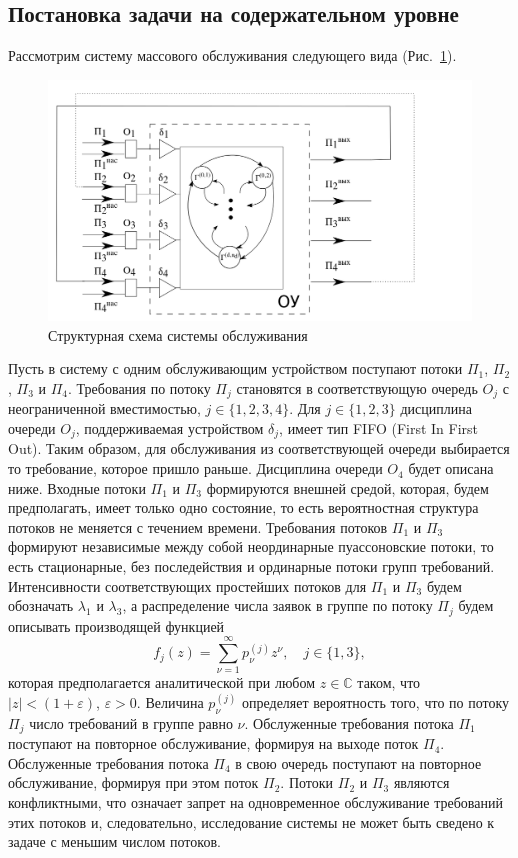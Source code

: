 \documentclass[a4paper,12pt,russian]{extarticle}
\begin{document}
\subsection{Постановка задачи на содержательном уровне}
Рассмотрим систему массового обслуживания следующего вида (Рис.~\ref{SystemScheme}).
\begin{figure}[h]
\includegraphics[scale=0.45]{SystemScheme.png} 
\caption{Структурная схема системы обслуживания}
\label{SystemScheme}
\end{figure}
Пусть в систему с одним обслуживающим устройством поступают потоки $\Pi_1$, $\Pi_2$, $\Pi_3$  и $\Pi_4$. Требования по потоку $\Pi_j$ становятся в соответствующую очередь $O_j$ с неограниченной вместимостью, $j\in \{1, 2, 3, 4\}$. Для $j \in \{1, 2, 3\}$ дисциплина очереди $O_j$, поддерживаемая устройством $\delta_j$, имеет тип FIFO (First In First Out). Таким образом, для обслуживания из соответствующей очереди выбирается то требование, которое пришло раньше. Дисциплина очереди $O_4$ будет описана ниже. Входные потоки $\Pi_1$ и $\Pi_3$ формируются внешней средой, которая, будем предполагать, имеет только одно состояние, то есть вероятностная структура потоков не меняется с течением времени. Требования потоков $\Pi_1$ и $\Pi_3$ формируют независимые между собой неординарные пуассоновские потоки, то есть  стационарные, без последействия и ординарные потоки групп требований. Интенсивности соответствующих простейших потоков для $\Pi_1$ и $\Pi_3$ будем обозначать $\lambda_1$ и $\lambda_3$, а распределение числа заявок в группе по потоку $\Pi_j$ будем описывать производящей функцией
\begin{equation}
f_j(z) = \sum_{\nu=1}^{\infty} p_{\nu}^{(j)} z ^{\nu}, \quad j\in \{1,3\},
\label{GeneratingFunc}
\end{equation}
которая предполагается аналитической при любом $z\in \mathbb{C}$ таком, что $|z|<(1+\varepsilon)$, $\varepsilon>0$. Величина $p_{\nu}^{(j)}$ определяет вероятность того, что по потоку $\Pi_j$ число требований в группе равно $\nu$. Обслуженные требования потока $\Pi_1$ поступают на повторное обслуживание, формируя на выходе поток $\Pi_4$. Обслуженные требования потока $\Pi_4$ в свою очередь поступают на повторное обслуживание, формируя при этом поток $\Pi_2$. Потоки $\Pi_2$ и $\Pi_3$ являются конфликтными, что означает запрет на одновременное обслуживание требований этих потоков и, следовательно, исследование системы не может быть сведено к задаче с меньшим числом потоков. 
\end{document}

